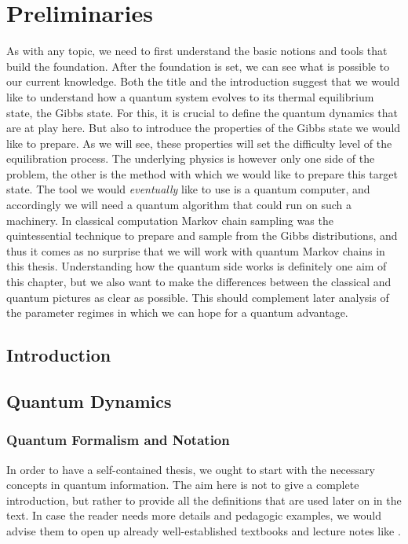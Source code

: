 \part{Preliminaries}

As with any topic, we need to first understand the basic notions and tools that build the foundation. After the foundation is set, we can see what is possible to our current knowledge. Both the title and the introduction suggest that we would like to understand how a quantum system evolves to its thermal equilibrium state, the Gibbs state. For this, it is crucial to define the quantum dynamics that are at play here. But also to introduce the properties of the Gibbs state we would like to prepare. As we will see, these properties will set the difficulty level of the equilibration process. The underlying physics is however only one side of the problem, the other is the method with which we would like to prepare this target state. The tool we would \textit{eventually} like to use is a quantum computer, and accordingly we will need a quantum algorithm that could run on such a machinery. In classical computation Markov chain sampling was the quintessential technique to prepare and sample from the Gibbs distributions, and thus it comes as no surprise that we will work with quantum Markov chains in this thesis. Understanding how the quantum side works is definitely one aim of this chapter, but we also want to make the differences between the classical and quantum pictures as clear as possible. This should complement later analysis of the parameter regimes in which we can hope for a quantum advantage.

\chapter{Introduction}
\newpage
\chapter{Quantum Dynamics}

\label{sec:quantum-formalism}
\section{Quantum Formalism and Notation}
In order to have a self-contained thesis, we ought to start with the necessary concepts in quantum information. The aim here is not to give a complete introduction, but rather to provide all the definitions that are used later on in the text. In case the reader needs more details and pedagogic examples, we would advise them to open up already well-established textbooks and lecture notes like \cite{bible, wolf2012lecture, breuer2002theory}.

